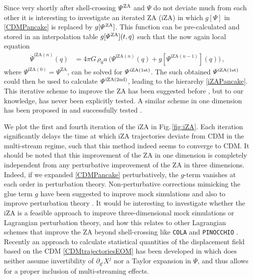 \documentclass[twocolumn, nofootinbib, showpacs, superscriptaddress]{revtex4-1}
\renewcommand{\v}[1]{\bm{#1} }
\begin{document}
Since very shortly after shell-crossing $\varPsi^{\rm ZA}$ and $\varPsi$ do not deviate much from each other it is interesting to investigate an iterated ZA (iZA) in which $g[\varPsi]$ in \eqref{CDMPancake} is replaced by $g[\varPsi^{\rm ZA}]$. 
This function can be pre-calculated and stored in an interpolation table $g[\varPsi^{\rm ZA}](t,q)$ such that the now again local equation 
   \begin{align} \label{iZAPancake}
 \ddot \varPsi^{\mathrm{iZA}(n)}(q)  &=  4 \pi G\,\rho_0 a\ \Big(\varPsi^{\mathrm{iZA}(n)}(q)  + g[\varPsi^{\mathrm{iZA}(n-1)}](q)  \Big) \,,
 \end{align}
 where $\varPsi^{\mathrm{iZA}(0)} = \varPsi^{\mathrm{ZA}}$,
 can be solved for $\varPsi^{\rm iZA (1st)}$. 
The such obtained $\varPsi^{\rm{iZA(1st)}}$ could then be used to calculate $\varPsi^{\rm{iZA(2nd)}}$, leading to the hierarchy \eqref{iZAPancake}. This iterative scheme to improve the ZA has been suggested before \cite{Tassev2011}, but to our knowledge, has never been explicitly tested.
A similar scheme in one dimension has been proposed in \cite{Colombi2015} and   successfully tested \cite{TaruyaColombi2017}.


We plot the first and fourth iteration of the iZA in Fig.\,\ref{fig:iZA}.
 Each iteration significantly delays the time at which iZA trajectories deviate from CDM in the multi-stream regime, such that this method indeed seems to converge to CDM.
It should be noted that this improvement of the ZA in one dimension is completely independent from any perturbative improvement of the ZA in three dimensions.
Indeed, if we expanded  \eqref{CDMPancake} perturbatively, the $g$-term vanishes at each order in perturbation theory.
Non-perturbative corrections mimicking the glue term $g$ have been suggested to improve mock simulations \cite{GurbatovSaichevShandarin1989,WeinbergGunn1990,GurbatovSaichevShandarin2012} and also to improve perturbation theory \cite{BuchertDominguezPerez-Mercader1999,Valageas2011,ValageasNishimichiTaruya2013}. 
 It would be interesting to investigate whether the iZA is a feasible approach to improve three-dimensional mock simulations or Lagrangian perturbation theory, and how this relates to other Lagrangian schemes that improve the ZA beyond shell-crossing like \texttt{COLA} \cite{TassevZaldarriagaEisenstein2013,TassevEisensteinWandeltEtal2015} and \texttt{PINOCCHIO} \cite{MonacoTheunsTaffoniEtal2002,MonacoTheunsTaffoni2002}.
 Recently an approach to calculate statistical quantities of the displacement field  based on the CDM \eqref{CDMtrajectoriesEOM} has been developed in \cite{McDonaldVlah2017} which does neither assume invertibility of $\partial_{q^i} X^j$ nor a Taylor expansion in $\v{\varPsi}$, and thus allows for a proper inclusion of multi-streaming effects.
\end{document}
